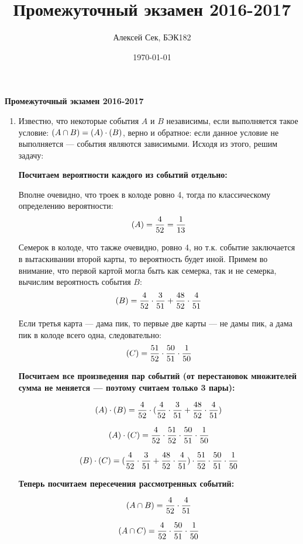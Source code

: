 \documentclass[a4paper]{article} %
\title{Промежуточный экзамен 2016-2017}
\author{Алексей Сек, БЭК182}
\date{\today}
\let\P\relax
\DeclareMathOperator{\P}{\mathbb{P}}
\begin{document}
\maketitle

\textbf{Промежуточный экзамен 2016-2017}

\begin{enumerate}

    \item
    Известно, что некоторые события $A$ и $B$ независимы, если выполняется такое условие:
    $ \P(A \cap B) = \P(A) \cdot \P(B) $, верно и обратное: если данное условие не выполняется — события являются зависимыми. Исходя из этого, решим задачу:
    
    \textbf{Посчитаем вероятности каждого из событий отдельно:}
    
    Вполне очевидно, что троек в колоде ровно 4, тогда по классическому определению вероятности:
    \[ \P(A) = \frac{4}{52} = \frac{1}{13} \]
    
    Семерок в колоде, что также очевидно, ровно 4, но т.к. событие заключается в вытаскивании второй карты, то вероятность будет иной.
    Примем во внимание, что первой картой могла быть как семерка, так и не семерка, вычислим вероятность события $B$: 
    \[\P(B) = \frac{4}{52}\cdot\frac{3}{51} + \frac{48}{52}\cdot\frac{4}{51} \]
    
    Если третья карта — дама пик, то первые две карты — не дамы пик, а дама пик в колоде всего одна, следовательно:
    \[ \P(C) = \frac{51}{52}\cdot\frac{50}{51}\cdot\frac{1}{50} \]
    
    \textbf{Посчитаем все произведения пар событий (от перестановок множителей сумма не меняется — поэтому считаем только 3 пары):}
    
    \[\P(A) \cdot \P(B) = \frac{4}{52}\cdot(\frac{4}{52}\cdot\frac{3}{51} + \frac{48}{52}\cdot\frac{4}{51}) \]
    
     \[\P(A) \cdot \P(C) = \frac{4}{52}\cdot\frac{51}{52}\cdot\frac{50}{51}\cdot\frac{1}{50} \]
    
     \[\P(B) \cdot \P(C) = (\frac{4}{52}\cdot\frac{3}{51} + \frac{48}{52}\cdot\frac{4}{51})\cdot\frac{51}{52}\cdot\frac{50}{51}\cdot\frac{1}{50} \]
    
    \textbf{Теперь посчитаем пересечения рассмотренных событий:}
    
    \[ \P(A \cap B) = \frac{4}{52}\cdot\frac{4}{51} \]
    
    \[ \P(A \cap C) = \frac{4}{52}\cdot\frac{50}{51}\cdot\frac{1}{50} \]
    

\end{enumerate}
\end{document}
